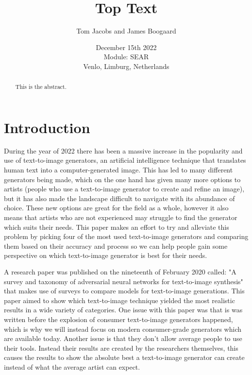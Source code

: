 \documentclass[]{report}
\title{Top Text}
\author{Tom Jacobs and James Boogaard}
\date{December 15th 2022 \\Module: SEAR \\Venlo, Limburg, Netherlands}
\begin{document}
	
	\maketitle
	
	\begin{abstract}
		This is the abstract.
		
		
	\end{abstract}
	
	\tableofcontents
	\setcounter{page}{3}
	\listoffigures %
	\pagebreak
	
	
	\section{Introduction}
During the year of 2022 there has been a massive increase in the popularity and use of text-to-image generators, an artificial intelligence technique that translates human text into a computer-generated image. This has led to many different generators being made, which on the one hand has given many more options to artists (people who use a text-to-image generator to create and refine an image), but it has also made the landscape difficult to navigate with its abundance of choice. These new options are great for the field as a whole, however it also means that artists who are not experienced may struggle to find the generator which suits their needs. This paper makes an effort to try and alleviate this problem by picking four of the most used text-to-image generators and comparing them based on their accuracy and process so we can help people gain some perspective on which text-to-image generator is best for their needs.

A research paper was published on the nineteenth of February 2020 called: "A survey and taxonomy of adversarial neural networks for text-to-image synthesis" that makes use of surveys to compare models for text-to-image generations. This paper aimed to show which text-to-image technique yielded the most realistic results in a wide variety of categories. One issue with this paper was that is was written before the explosion of consumer text-to-image generators happened, which is why we will instead focus on modern consumer-grade generators which are available today. Another issue is that they don't allow average people to use their tools. Instead their results are created by the researchers themselves, this causes the results to show the absolute best a text-to-image generator can create instead of what the average artist can expect.
\end{document}
